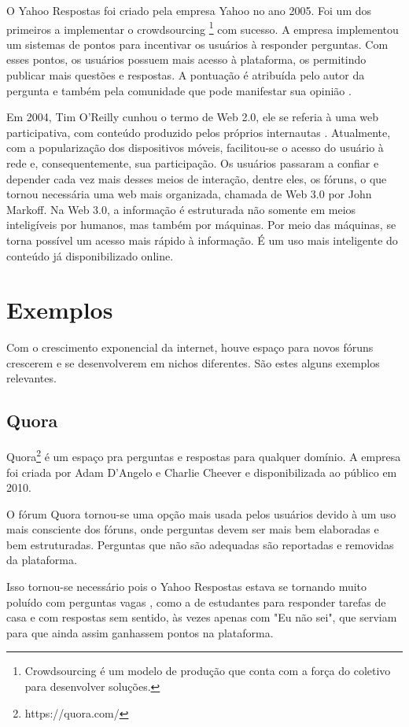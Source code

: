 O Yahoo Respostas foi criado pela empresa Yahoo no ano 2005. Foi um dos primeiros a implementar o crowdsourcing \footnote{Crowdsourcing é um modelo de produção que conta com a força do coletivo para desenvolver soluções.} com sucesso. A empresa implementou um sistemas de pontos para incentivar os usuários à responder perguntas. Com esses pontos, os usuários possuem mais acesso à plataforma, os permitindo publicar mais questões e respostas. A pontuação é atribuída pelo autor da pergunta e também pela comunidade que pode manifestar sua opinião \cite{yahooanswerswiki}.

Em 2004, Tim O'Reilly cunhou o termo de Web 2.0, ele se referia à uma web participativa, com conteúdo produzido pelos próprios internautas \cite{webtransition}. Atualmente, com a popularização dos dispositivos móveis, facilitou-se o acesso do usuário à rede e, consequentemente, sua participação. Os usuários passaram a confiar e depender cada vez mais desses meios de interação, dentre eles, os fóruns, o que tornou necessária uma web mais organizada, chamada de Web 3.0 por John Markoff. Na Web 3.0, a informação é estruturada não somente em meios inteligíveis por humanos, mas também por máquinas. Por meio das máquinas, se torna possível um acesso mais rápido à informação. É um uso mais inteligente do conteúdo já disponibilizado online.
\section{Exemplos}
Com o crescimento exponencial da internet, houve espaço para novos fóruns crescerem e se desenvolverem em nichos diferentes. São estes alguns exemplos relevantes.
\subsection{Quora}
Quora\footnote{https://quora.com/} é um espaço pra perguntas e respostas para qualquer domínio. A empresa foi criada por Adam D'Angelo e Charlie Cheever e disponibilizada ao público em 2010.

O fórum Quora tornou-se uma opção mais usada pelos usuários devido à um uso mais consciente dos fóruns, onde perguntas devem ser mais bem elaboradas e bem estruturadas. Perguntas que não são adequadas são reportadas e removidas da plataforma.

Isso tornou-se necessário pois o Yahoo Respostas estava se tornando muito poluído com perguntas vagas \cite{quoravsyahoo}, como a de estudantes para responder tarefas de casa e com respostas sem sentido, às vezes apenas com "Eu não sei", que serviam para que ainda assim ganhassem pontos na plataforma.


